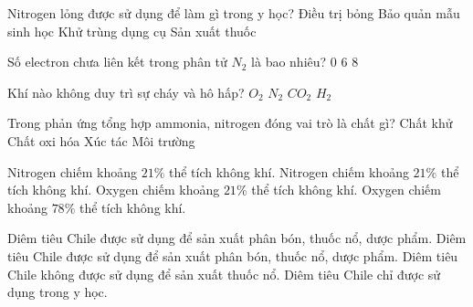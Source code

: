 \begin{ex}
    Nitrogen lỏng được sử dụng để làm gì trong y học?
    \choice
    {Điều trị bỏng}
    {\True Bảo quản mẫu sinh học}
    {Khử trùng dụng cụ}
    {Sản xuất thuốc}
\end{ex}

\begin{ex}
    Số electron chưa liên kết trong phân tử $N_2$ là bao nhiêu?
    \choice
    {0}
    {}
    {6}
    {8}
\end{ex}

\begin{ex}
    Khí nào không duy trì sự cháy và hô hấp?
    \choice
    {$O_2$}
    {\True $N_2$}
    {$CO_2$}
    {$H_2$}
\end{ex}

\begin{ex}
    Trong phản ứng tổng hợp ammonia, nitrogen đóng vai trò là chất gì?
    \choice
    {Chất khử}
    {\True Chất oxi hóa}
    {Xúc tác}
    {Môi trường}
\end{ex}


\begin{ex}
	Nitrogen chiếm khoảng $21\%$ thể tích không khí.
	{Nitrogen chiếm khoảng $21\%$ thể tích không khí.}
	{\True Oxygen chiếm khoảng $21\%$ thể tích không khí.}
	{Oxygen chiếm khoảng $78\%$ thể tích không khí.}
\end{ex}

\begin{ex}
	Diêm tiêu Chile được sử dụng để sản xuất phân bón, thuốc nổ, dược phẩm.
	{\True Diêm tiêu Chile được sử dụng để sản xuất phân bón, thuốc nổ, dược phẩm.}
	{Diêm tiêu Chile không được sử dụng để sản xuất thuốc nổ.}
	{Diêm tiêu Chile chỉ được sử dụng trong y học.}
\end{ex}


